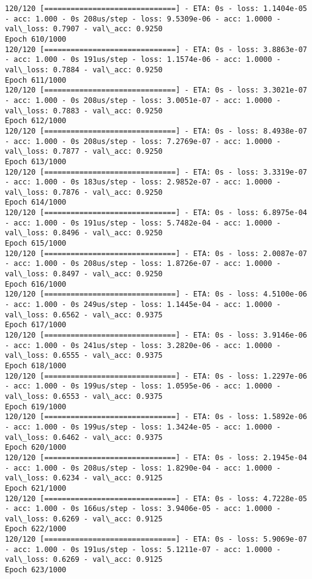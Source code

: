 \documentclass[11pt]{article}
\begin{document}
\begin{Verbatim}[commandchars=\\\{\}]
120/120 [==============================] - ETA: 0s - loss: 1.1404e-05 - acc: 1.000 - 0s 208us/step - loss: 9.5309e-06 - acc: 1.0000 - val\_loss: 0.7907 - val\_acc: 0.9250
Epoch 610/1000
120/120 [==============================] - ETA: 0s - loss: 3.8863e-07 - acc: 1.000 - 0s 191us/step - loss: 1.1574e-06 - acc: 1.0000 - val\_loss: 0.7884 - val\_acc: 0.9250
Epoch 611/1000
120/120 [==============================] - ETA: 0s - loss: 3.3021e-07 - acc: 1.000 - 0s 208us/step - loss: 3.0051e-07 - acc: 1.0000 - val\_loss: 0.7883 - val\_acc: 0.9250
Epoch 612/1000
120/120 [==============================] - ETA: 0s - loss: 8.4938e-07 - acc: 1.000 - 0s 208us/step - loss: 7.2769e-07 - acc: 1.0000 - val\_loss: 0.7877 - val\_acc: 0.9250
Epoch 613/1000
120/120 [==============================] - ETA: 0s - loss: 3.3319e-07 - acc: 1.000 - 0s 183us/step - loss: 2.9852e-07 - acc: 1.0000 - val\_loss: 0.7876 - val\_acc: 0.9250
Epoch 614/1000
120/120 [==============================] - ETA: 0s - loss: 6.8975e-04 - acc: 1.000 - 0s 191us/step - loss: 5.7482e-04 - acc: 1.0000 - val\_loss: 0.8496 - val\_acc: 0.9250
Epoch 615/1000
120/120 [==============================] - ETA: 0s - loss: 2.0087e-07 - acc: 1.000 - 0s 208us/step - loss: 1.8726e-07 - acc: 1.0000 - val\_loss: 0.8497 - val\_acc: 0.9250
Epoch 616/1000
120/120 [==============================] - ETA: 0s - loss: 4.5100e-06 - acc: 1.000 - 0s 249us/step - loss: 1.1445e-04 - acc: 1.0000 - val\_loss: 0.6562 - val\_acc: 0.9375
Epoch 617/1000
120/120 [==============================] - ETA: 0s - loss: 3.9146e-06 - acc: 1.000 - 0s 241us/step - loss: 3.2820e-06 - acc: 1.0000 - val\_loss: 0.6555 - val\_acc: 0.9375
Epoch 618/1000
120/120 [==============================] - ETA: 0s - loss: 1.2297e-06 - acc: 1.000 - 0s 199us/step - loss: 1.0595e-06 - acc: 1.0000 - val\_loss: 0.6553 - val\_acc: 0.9375
Epoch 619/1000
120/120 [==============================] - ETA: 0s - loss: 1.5892e-06 - acc: 1.000 - 0s 199us/step - loss: 1.3424e-05 - acc: 1.0000 - val\_loss: 0.6462 - val\_acc: 0.9375
Epoch 620/1000
120/120 [==============================] - ETA: 0s - loss: 2.1945e-04 - acc: 1.000 - 0s 208us/step - loss: 1.8290e-04 - acc: 1.0000 - val\_loss: 0.6234 - val\_acc: 0.9125
Epoch 621/1000
120/120 [==============================] - ETA: 0s - loss: 4.7228e-05 - acc: 1.000 - 0s 166us/step - loss: 3.9406e-05 - acc: 1.0000 - val\_loss: 0.6269 - val\_acc: 0.9125
Epoch 622/1000
120/120 [==============================] - ETA: 0s - loss: 5.9069e-07 - acc: 1.000 - 0s 191us/step - loss: 5.1211e-07 - acc: 1.0000 - val\_loss: 0.6269 - val\_acc: 0.9125
Epoch 623/1000

\end{Verbatim}
\end{document}
